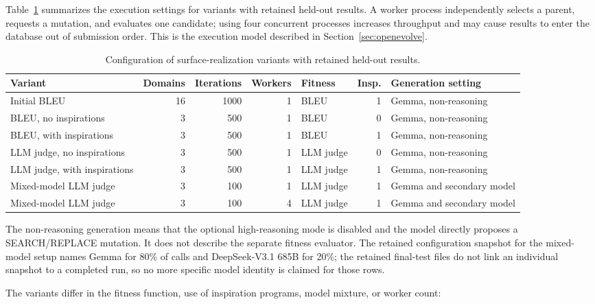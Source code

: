 Table~\ref{tab:surface-variant-configurations} summarizes the execution
settings for variants with retained held-out results. A worker process
independently selects a parent, requests a mutation, and evaluates one candidate;
using four concurrent processes increases throughput and may cause results to
enter the database out of submission order. This is the execution model described
in Section~\ref{sec:openevolve}.

\begin{table}[!htbp]
\centering
\caption{Configuration of surface-realization variants with retained held-out results.}
\label{tab:surface-variant-configurations}
\begin{tabular}{>{\raggedright\arraybackslash}p{74pt}rrr>{\raggedright\arraybackslash}p{42pt}r>{\raggedright\arraybackslash}p{90pt}}
\hline
\textbf{Variant} & \textbf{Domains} & \textbf{Iterations} & \textbf{Workers} & \textbf{Fitness} & \textbf{Insp.} & \textbf{Generation setting} \\
\hline
Initial BLEU & 16 & 1000 & 1 & BLEU & 1 & Gemma, non-reasoning \\
BLEU, no inspirations & 3 & 500 & 1 & BLEU & 0 & Gemma, non-reasoning \\
BLEU, with inspirations & 3 & 500 & 1 & BLEU & 1 & Gemma, non-reasoning \\
LLM judge, no inspirations & 3 & 500 & 1 & LLM judge & 0 & Gemma, non-reasoning \\
LLM judge, with inspirations & 3 & 500 & 1 & LLM judge & 1 & Gemma, non-reasoning \\
Mixed-model LLM judge & 3 & 100 & 1 & LLM judge & 1 & Gemma and secondary model \\
Mixed-model LLM judge & 3 & 100 & 4 & LLM judge & 1 & Gemma and secondary model \\
\hline
\end{tabular}
\end{table}

The non-reasoning generation means that the optional high-reasoning
mode is disabled and the model directly
proposes a SEARCH/REPLACE mutation. It does not describe the separate fitness
evaluator. The retained configuration snapshot for the mixed-model setup names
Gemma for 80\% of calls and DeepSeek-V3.1 685B for 20\%; the retained final-test files do
not link an individual snapshot to a completed run, so no more specific model
identity is claimed for those rows.

The variants differ in the fitness function, use of inspiration programs, model
mixture, or worker count:

